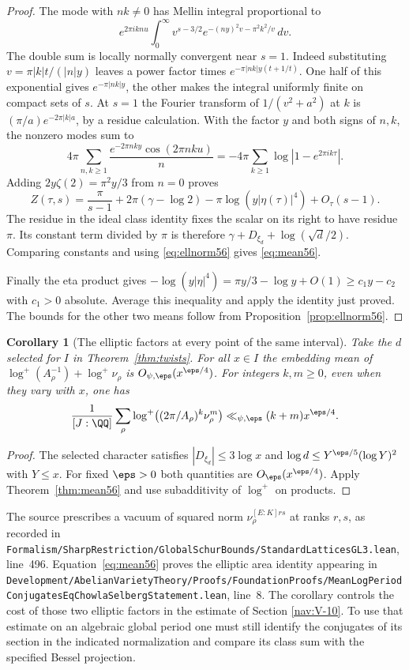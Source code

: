 \documentclass[a4paper,11pt]{article}
\newtheorem{corollary}[proposition]{Corollary}
\theoremstyle{definition}
\theoremstyle{remark}
\newcommand{\srcloc}[2]{{\small\nolinkurl{#1.lean}}, line~#2}
\numberwithin{equation}{section}
\begin{document}
\begin{proof}
The mode with \(n k\ne0\) has Mellin integral proportional to
\[
  e^{2\pi i knu}\int_0^\infty
   v^{s-3/2}e^{-(ny)^2v-\pi^2 k^2/v}\,dv .
\]
The double sum is locally normally convergent near \(s=1\).
Indeed substituting \(v=\pi|k|t/(|n|y)\) leaves a power factor
times \(e^{-\pi |nk|y(t+1/t)}\). One half of this exponential
gives \(e^{-\pi|nk|y}\), the other makes the integral uniformly
finite on compact sets of \(s\). At \(s=1\) the Fourier
transform of \(1/(v^2+a^2)\) at \(k\) is
\((\pi/a)e^{-2\pi |k|a}\), by a residue calculation. With the
factor \(y\) and both signs of \(n,k\), the nonzero modes sum to
\[
  4\pi\sum_{n,k\ge1}\frac{e^{-2\pi nky}\cos(2\pi nku)}{n}
        =-4\pi\sum_{k\ge1}\log|1-e^{2\pi i k\tau}|.
\]
Adding \(2y\zeta(2)=\pi^2y/3\) from \(n=0\) proves
\[
 Z(\tau,s)=\frac{\pi}{s-1}+2\pi(\gamma-\log2)
                    -\pi\log(y|\eta(\tau)|^4)+O_\tau(s-1).
\]
The residue in the ideal class identity fixes the scalar on its
right to have residue \(\pi\). Its constant term divided by \(\pi\)
is therefore \(\gamma+D_{\xi_d}+\log(\sqrt d/2)\).
Comparing constants and using \eqref{eq:ellnorm56} gives
\eqref{eq:mean56}.

Finally the eta product gives
\(-\log(y|\eta|^4)=\pi y/3-\log y+O(1)\ge c_1y-c_2\)
with \(c_1>0\) absolute. Average this inequality and apply the
identity just proved. The bounds for the other two means follow
from Proposition~\ref{prop:ellnorm56}.
\end{proof}

\begin{corollary}[The elliptic factors at every point of the same interval]\label{cor:interval56}
Take the \(d\) selected for \(I\) in Theorem~\ref{thm:twists}.
For all \(x\in I\) the embedding mean of
\(\log^+(A_\rho^{-1})+\log^+\nu_\rho\) is
\(O_{\psi,\eps}(x^{\eps/4})\). For integers \(k,m\ge0\), even
when they vary with \(x\), one has
\[
  \frac1{[J:\QQ]}\sum_\rho
      \log^+\!\left((2\pi/A_\rho)^k\nu_\rho^m\right)
                    \ll_{\psi,\eps}(k+m)x^{\eps/4}.
\]
\end{corollary}
\begin{proof}
The selected character satisfies
\(|D_{\xi_d}|\le3\log x\) and
\(\log d\le Y^{\eps/5}(\log Y)^2\) with \(Y\le x\).
For fixed \(\eps>0\) both quantities are
\(O_\eps(x^{\eps/4})\). Apply Theorem~\ref{thm:mean56} and use
subadditivity of \(\log^+\) on products.
\end{proof}

The source prescribes a vacuum of squared norm
\(\nu_\rho^{[E:K]rs}\) at ranks \(r,s\), as recorded in
\srcloc{Formalism/SharpRestriction/GlobalSchurBounds/StandardLatticesGL3}{496}.
Equation~\eqref{eq:mean56} proves the elliptic area identity
appearing in
\srcloc{Development/AbelianVarietyTheory/Proofs/FoundationProofs/MeanLogPeriodConjugatesEqChowlaSelbergStatement}{8}.
The corollary controls the cost of those two elliptic factors in
the estimate of Section \ref{nav:V-10}. To use that estimate on an algebraic global period
one must still identify the conjugates of its section in the
indicated normalization and compare its class sum with the
specified Bessel projection.
\end{document}
